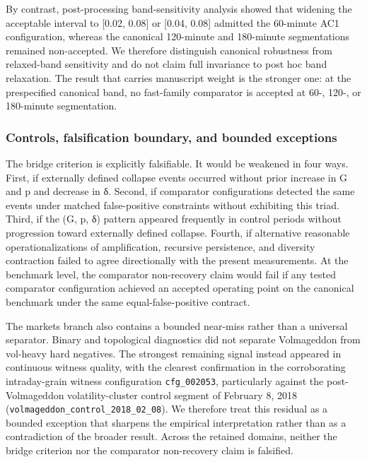 \documentclass[
  11pt,
]{article}
\begin{document}
By contrast, post-processing band-sensitivity analysis showed that
widening the acceptable interval to {[}0.02, 0.08{]} or {[}0.04, 0.08{]}
admitted the 60-minute AC1 configuration, whereas the canonical
120-minute and 180-minute segmentations remained non-accepted. We
therefore distinguish canonical robustness from relaxed-band sensitivity
and do not claim full invariance to post hoc band relaxation. The result
that carries manuscript weight is the stronger one: at the prespecified
canonical band, no fast-family comparator is accepted at 60-, 120-, or
180-minute segmentation.

\subsubsection{Controls, falsification boundary, and bounded
exceptions}\label{controls-falsification-boundary-and-bounded-exceptions}

The bridge criterion is explicitly falsifiable. It would be weakened in
four ways. First, if externally defined collapse events occurred without
prior increase in G and p and decrease in δ. Second, if comparator
configurations detected the same events under matched false-positive
constraints without exhibiting this triad. Third, if the (G, p, δ)
pattern appeared frequently in control periods without progression
toward externally defined collapse. Fourth, if alternative reasonable
operationalizations of amplification, recursive persistence, and
diversity contraction failed to agree directionally with the present
measurements. At the benchmark level, the comparator non-recovery claim
would fail if any tested comparator configuration achieved an accepted
operating point on the canonical benchmark under the same
equal-false-positive contract.

The markets branch also contains a bounded near-miss rather than a
universal separator. Binary and topological diagnostics did not separate
Volmageddon from vol-heavy hard negatives. The strongest remaining
signal instead appeared in continuous witness quality, with the clearest
confirmation in the corroborating intraday-grain witness configuration
\texttt{cfg\_002053}, particularly against the post-Volmageddon
volatility-cluster control segment of February 8, 2018
(\texttt{volmageddon\_control\_2018\_02\_08}). We therefore treat this
residual as a bounded exception that sharpens the empirical
interpretation rather than as a contradiction of the broader result.
Across the retained domains, neither the bridge criterion nor the
comparator non-recovery claim is falsified.
\end{document}
